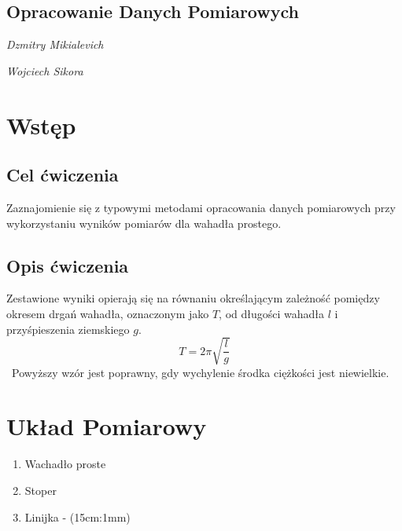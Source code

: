 \documentclass[18pt, twoside]{article}
\begin{document}
\begin{figure}[tp!]
\end{figure}

\begin{center}
	\section*{Opracowanie Danych Pomiarowych}
	\emph{Dzmitry Mikialevich}
\end{center}
\begin{center}
	\emph{Wojciech Sikora}
\end{center}
\tableofcontents
\newpage

\section{Wstęp}

    \subsection{Cel ćwiczenia}
    Zaznajomienie się z typowymi metodami opracowania danych pomiarowych
    przy wykorzystaniu wyników pomiarów dla wahadła prostego. 
    
    \subsection{Opis ćwiczenia}
    Zestawione wyniki opierają się na równaniu określającym zależność pomiędzy okresem drgań wahadła, oznaczonym jako \(T\), od długości wahadła \(l\) i przyśpieszenia ziemskiego \(g\).
    \[T = 2\pi \sqrt{\frac{l}{g}}\] \
    Powyższy wzór jest poprawny, gdy wychylenie środka ciężkości jest niewielkie.
    
\section{Układ Pomiarowy}
    \begin{enumerate}
    	\item Wachadło proste
    	\item Stoper
    	\item Linijka - (15cm:1mm)
    \end{enumerate}
\end{document}
